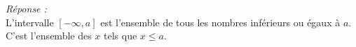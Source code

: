\textit{Réponse : }\\

L'intervalle $[-\infty , a]$ est l'ensemble de tous les nombres inférieurs ou égaux à $a$. C'est l'ensemble des $x$ tels que $x\leq a$.